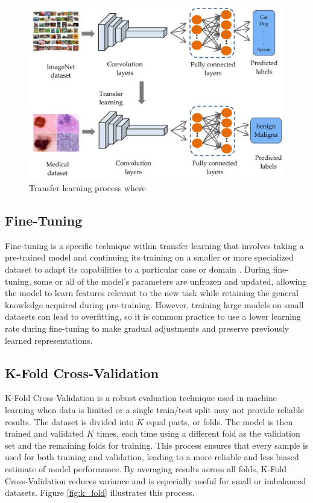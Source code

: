 \documentclass[a4paper,10pt]{book}
\begin{document}
\begin{figure}[h!]
    \centering
    \includegraphics[width=0.75\linewidth]{reports//assets/transfer-learning.png}
    \caption[Transfer learning process]{Transfer learning process where}
    \label{fig:transfer_learning}
\end{figure}


\subsection{Fine-Tuning}

Fine-tuning is a specific technique within transfer learning that involves taking a pre-trained model and continuing its training on a smaller or more specialized dataset to adapt its capabilities to a particular case or domain \cite{noauthor_what_2024}. During fine-tuning, some or all of the model’s parameters are unfrozen and updated, allowing the model to learn features relevant to the new task while retaining the general knowledge acquired during pre-training. However, training large models on small datasets can lead to overfitting, so it is common practice to use a lower learning rate during fine-tuning to make gradual adjustments and preserve previously learned representations.

\subsection{K-Fold Cross-Validation}

K-Fold Cross-Validation is a robust evaluation technique used in machine learning when data is limited or a single train/test split may not provide reliable results. The dataset is divided into $K$ equal parts, or folds. The model is then trained and validated $K$ times, each time using a different fold as the validation set and the remaining folds for training. This process ensures that every sample is used for both training and validation, leading to a more reliable and less biased estimate of model performance. By averaging results across all folds, K-Fold Cross-Validation reduces variance and is especially useful for small or imbalanced datasets. Figure \ref{fig:k_fold} illustrates this process.
\end{document}
